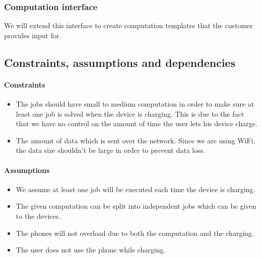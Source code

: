 \documentclass[a4paper,10pt]{article}
\begin{document}


\newpage
\subsubsection{Computation interface}

We will extend this interface to create computation templates that the customer provides input for.








\subsection{Constraints, assumptions and dependencies}
\paragraph{Constraints}
\begin{itemize}
	\item The jobs should have small to medium computation in order to make sure at least one job is solved when the device is charging. This is due to the fact that we have no control on the amount of time the user lets his device charge.

	\item The amount of data which is sent over the network. Since we are using WiFi, the data size shouldn't be large in order to prevent data loss.
\end{itemize} 

\paragraph{Assumptions}
\begin{itemize}
	\item We assume at least one job will be executed each time the device is charging. 
	\item The given computation can be split into independent jobs which can be given to the devices.
	\item The phones will not overload due to both the computation and the charging.
	\item The user does not use the phone while charging.
\end{itemize} 
\end{document}
